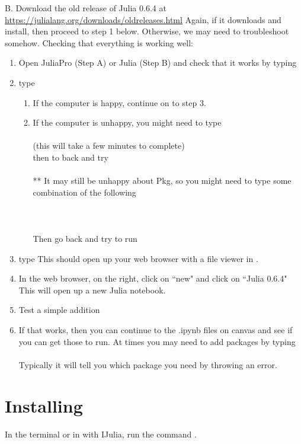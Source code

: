 B.	Download the old release of Julia 0.6.4 at 
\url{https://julialang.org/downloads/oldreleases.html}
Again, if it downloads and install, then proceed to step 1 below.  Otherwise, we may need to troubleshoot somehow.  
Checking that everything is working well:
\begin{enumerate}
\item  Open JuliaPro (Step A) or Julia (Step B) and check that it works by typing \\
\item   type \\
\begin{enumerate}
\item  If the computer is happy, continue on to step 3.
\item If the computer is unhappy, you might need to type\\
\\
(this will take a few minutes to complete)\\
then to back and try  \\
\\
** It may still be unhappy about Pkg, so you might need to type some combination of the following\\
\\
\\
\\
Then go back and try to run 
\end{enumerate}
\item  type
This should open up your web browser with a file viewer in \jupyter. 
\item  In the web browser, on the right, click on ``new" and click on ``Julia 0.6.4"
This will open up a new Julia notebook.
\item  Test a simple addition
\item  If that works, then you can continue to the .ipynb files on canvas and see if you can get those to run.
At times you may need to add packages by typing\\
\\
Typically it will tell you which package you need by throwing an error.
\end{enumerate}

\section{Installing \protect\jump}
In the \julia terminal or in \jupyter with IJulia, run the command .

